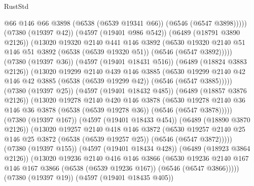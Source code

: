 \begin{lexlean}{RustStd}
\begin{coremodule}
                      @66
                      @146
                      @66
                      @3898
                      (@6538 (@6539 @19341 @66))
                      (@6546 (@6547 @3898)))))
                (@7380 (@19397 @42))
                (@4597 (@19401 @986 @542))
                (@6489 (@18791 @3890 @2126))
                (@13020
                  @19320
                  @2140
                  @441
                  @146
                  @3892
                  (@6530
                    @19320
                    @2140
                    @51
                    @146
                    @51
                    @3892
                    (@6538 (@6539 @19320 @51))
                    (@6546 (@6547 @3892)))))
              (@7380 (@19397 @36))
              (@4597 (@19401 @18431 @516))
              (@6489 (@18824 @3883 @2126))
              (@13020
                @19299
                @2140
                @439
                @146
                @3885
                (@6530
                  @19299
                  @2140
                  @42
                  @146
                  @42
                  @3885
                  (@6538 (@6539 @19299 @42))
                  (@6546 (@6547 @3885)))))
            (@7380 (@19397 @25))
            (@4597 (@19401 @18432 @485))
            (@6489 (@18857 @3876 @2126))
            (@13020
              @19278
              @2140
              @420
              @146
              @3878
              (@6530
                @19278
                @2140
                @36
                @146
                @36
                @3878
                (@6538 (@6539 @19278 @36))
                (@6546 (@6547 @3878)))))
          (@7380 (@19397 @167))
          (@4597 (@19401 @18433 @454))
          (@6489 (@18890 @3870 @2126))
          (@13020
            @19257
            @2140
            @418
            @146
            @3872
            (@6530
              @19257
              @2140
              @25
              @146
              @25
              @3872
              (@6538 (@6539 @19257 @25))
              (@6546 (@6547 @3872)))))
        (@7380 (@19397 @155))
        (@4597 (@19401 @18434 @428))
        (@6489 (@18923 @3864 @2126))
        (@13020
          @19236
          @2140
          @416
          @146
          @3866
          (@6530
            @19236
            @2140
            @167
            @146
            @167
            @3866
            (@6538 (@6539 @19236 @167))
            (@6546 (@6547 @3866)))))
      (@7380 (@19397 @19))
      (@4597 (@19401 @18435 @405))

\end{coremodule}
\end{lexlean}
